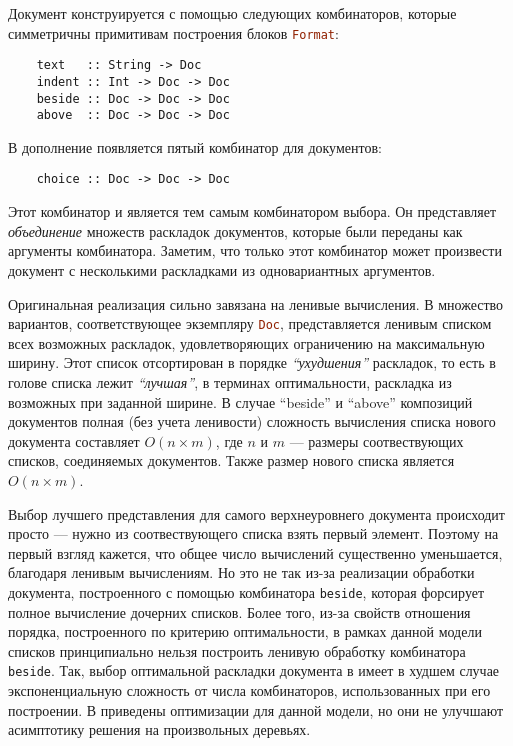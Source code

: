Документ конструируется с помощью следующих комбинаторов, которые симметричны
примитивам построения блоков \lstinline[language = Haskell]{Format}:
\begin{lstlisting}
    text   :: String -> Doc
    indent :: Int -> Doc -> Doc
    beside :: Doc -> Doc -> Doc
    above  :: Doc -> Doc -> Doc
\end{lstlisting}

В дополнение появляется пятый комбинатор для документов:
\begin{lstlisting}
    choice :: Doc -> Doc -> Doc
\end{lstlisting}

Этот комбинатор и является тем самым комбинатором выбора. Он представляет
\emph{объединение} множеств раскладок документов, которые были переданы как
аргументы комбинатора. Заметим, что только этот комбинатор может произвести
документ с несколькими раскладками из одновариантных аргументов.

Оригинальная реализация сильно завязана на ленивые вычисления. В \cite{swierstra}
множество вариантов, соответствующее экземпляру \lstinline[language = Haskell]{Doc},
представляется ленивым списком всех возможных раскладок, удовлетворяющих ограничению
на максимальную ширину. Этот список отсортирован в порядке \emph{``ухудшения''}
раскладок, то есть в голове списка лежит \emph{``лучшая''}, в терминах оптимальности,
раскладка из возможных при заданной ширине. В случае ``beside'' и ``above'' композиций
документов полная (без учета ленивости) сложность вычисления списка нового документа
составляет $O(n \times m)$, где $n$ и $m$ --- размеры соотвествующих списков,
соединяемых документов. Также размер нового списка является $O(n \times m)$.

Выбор лучшего представления для самого верхнеуровнего документа происходит
просто --- нужно из соотвествующего списка взять первый элемент. Поэтому
на первый взгляд кажется, что общее число вычислений существенно уменьшается,
благодаря ленивым вычислениям. Но это не так из-за реализации обработки документа,
построенного с помощью комбинатора \lstinline[language = Haskell]{beside}, которая
форсирует полное вычисление дочерних списков. Более того, из-за свойств отношения
порядка, построенного по критерию оптимальности, в рамках данной модели списков
принципиально нельзя построить ленивую обработку комбинатора
\lstinline[language = Haskell]{beside}.
Так, выбор оптимальной раскладки документа в
\cite{swierstra} имеет в худшем случае экспоненциальную сложность от числа
комбинаторов, использованных при его построении.
В \cite{swiComb} приведены оптимизации для данной модели, но они
не улучшают асимптотику решения на произвольных деревьях.

